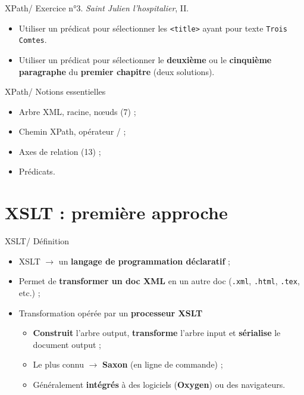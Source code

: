 \documentclass{beamer}
\begin{document}
    \begin{frame}{XPath/ Exercice n°3. \textit{Saint Julien l'hospitalier}, II.}
        \Large
        \begin{itemize}
            \item Utiliser un prédicat pour sélectionner les \texttt{<title>} ayant pour texte \texttt{Trois Comtes}.
            \bigskip
            \item Utiliser un prédicat pour sélectionner le \textbf{deuxième} ou le \textbf{cinquième paragraphe} du \textbf{premier chapitre} (deux solutions).
            \bigskip
            
        \end{itemize}
    \end{frame}

    \begin{frame}{XPath/ Notions essentielles}
        \Large
        \begin{itemize}
            \item Arbre XML, racine, n\oe uds (7) ;
            \item Chemin XPath, opérateur / ;
            \item Axes de relation (13) ;
            \item Prédicats.
        \end{itemize}
    \end{frame}

    \section{XSLT : première approche}

    \begin{frame}{XSLT/ Définition}
        \Large
        \begin{itemize}
            \item XSLT $\rightarrow$ un \textbf{langage de programmation déclaratif} ;
            \item Permet de \textbf{transformer un doc XML} en un autre doc  (\texttt{.xml}, \texttt{.html}, \texttt{.tex}, etc.) ;
            \item Transformation opérée par un \textbf{processeur XSLT}
            \begin{itemize}
                \item \textbf{Construit} l'arbre output, \textbf{transforme} l'arbre input et \textbf{sérialise} le document output ;
                \item Le plus connu $\rightarrow$ \textbf{Saxon} (en ligne de commande) ;
                \item Généralement \textbf{intégrés} à des logiciels (\textbf{Oxygen}) ou des navigateurs.
            \end{itemize}
        \end{itemize}
    \end{frame}
\end{document}

